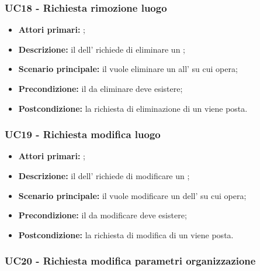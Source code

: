\documentclass[casi-duso]{subfiles}
\begin{document}
\subsubsection{UC18 - Richiesta rimozione luogo}
\label{subsub:UC18}

\begin{itemize}
  \item \textbf{Attori primari:} ;
  \item \textbf{Descrizione:} il  dell' richiede di eliminare un ;
  \item \textbf{Scenario principale:} il  vuole eliminare un  all' su cui opera;
  \item \textbf{Precondizione:} il  da eliminare deve esistere;
  \item \textbf{Postcondizione:} la richiesta di eliminazione di un  viene posta.

\end{itemize}

\subsubsection{UC19 - Richiesta modifica luogo}
\label{subsub:UC19}

\begin{itemize}
  \item \textbf{Attori primari:} ;
  \item \textbf{Descrizione:} il  dell' richiede di modificare un ;
  \item \textbf{Scenario principale:} il  vuole modificare un  dell' su cui opera;
  \item \textbf{Precondizione:} il  da modificare deve esistere;
  \item \textbf{Postcondizione:} la richiesta di modifica di un  viene posta.

\end{itemize}


\subsubsection{UC20 - Richiesta modifica parametri organizzazione}
\label{subsub:UC20}
\end{document}
